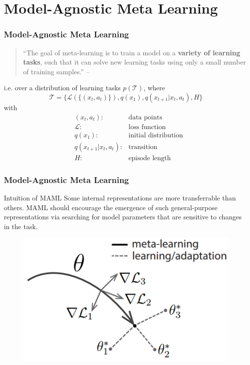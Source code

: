 
\section[MAML]{Model-Agnostic Meta Learning}


\begin{frame}
\frametitle{Model-Agnostic Meta Learning}

\begin{quote}
    ``The goal of meta-learning is to train a model on a {\bfseries variety of learning tasks}, such that it can solve new learning tasks using only a small number of training samples.'' \hfill -- \cite{finn2017maml}
\end{quote}

\vspace{0.6em}

i.e. over a distribution of learning tasks $p(\mathcal{T})$, where
$$\mathcal{T} = \{ \mathcal{L}(\{(x_t,a_t)\}), q(x_1), q(x_{t+1}|x_t, a_t), H \}$$
with
\begin{align*}
    & (x_t,a_t): & \text{data points} \\
    & \mathcal{L}: & \text{loss function} \\
    & q(x_1): & \text{initial distribution} \\
    & q(x_{t+1}|x_t, a_t): & \text{transition} \\
    & H: & \text{episode length}
\end{align*}

\end{frame}


\begin{frame}
\frametitle{Model-Agnostic Meta Learning}

\begin{block}{Intuition of MAML}
Some internal representations are more transferrable than others. MAML should encourage the emergence of such general-purpose representations via searching for model parameters that are sensitive to changes in the task.
\end{block}

\begin{figure}
    \centering
    \includegraphics[keepaspectratio,width=.7\textwidth]{images/maml.png}
    \label{fig:my_label}
\end{figure}

\end{frame}

